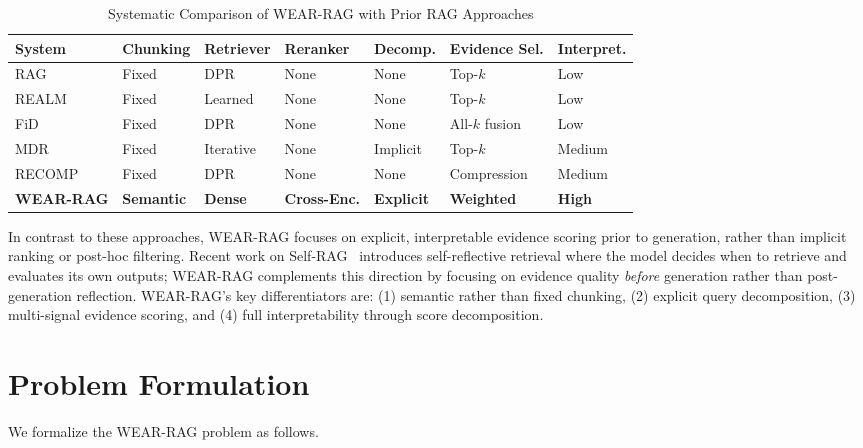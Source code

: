\documentclass[conference]{IEEEtran}
\begin{document}
\begin{table}[t]
\centering
\caption{Systematic Comparison of WEAR-RAG with Prior RAG Approaches}
\label{tab:lit-compare}
\footnotesize
\begin{tabular}{p{2.2cm} p{1.8cm} p{1.5cm} p{1.5cm} p{1.5cm} p{1.8cm} p{2.0cm}}
\toprule
\textbf{System} & \textbf{Chunking} & \textbf{Retriever} & \textbf{Reranker} & \textbf{Decomp.} & \textbf{Evidence Sel.} & \textbf{Interpret.} \\
\midrule
RAG~\cite{lewis2020rag} & Fixed & DPR & None & None & Top-$k$ & Low \\
REALM~\cite{guu2020realm} & Fixed & Learned & None & None & Top-$k$ & Low \\
FiD~\cite{izacard2021leveraging} & Fixed & DPR & None & None & All-$k$ fusion & Low \\
MDR~\cite{xiong2021mdr} & Fixed & Iterative & None & Implicit & Top-$k$ & Medium \\
RECOMP~\cite{xu2024recomp} & Fixed & DPR & None & None & Compression & Medium \\
\textbf{WEAR-RAG} & \textbf{Semantic} & \textbf{Dense} & \textbf{Cross-Enc.} & \textbf{Explicit} & \textbf{Weighted} & \textbf{High} \\
\bottomrule
\end{tabular}
\end{table}

In contrast to these approaches, WEAR-RAG focuses on explicit, interpretable evidence scoring prior to generation, rather than implicit ranking or post-hoc filtering. Recent work on Self-RAG~\cite{asai2024selfrag} introduces self-reflective retrieval where the model decides when to retrieve and evaluates its own outputs; WEAR-RAG complements this direction by focusing on evidence quality \textit{before} generation rather than post-generation reflection. WEAR-RAG's key differentiators are: (1) semantic rather than fixed chunking, (2) explicit query decomposition, (3) multi-signal evidence scoring, and (4) full interpretability through score decomposition.

\section{Problem Formulation}

We formalize the WEAR-RAG problem as follows.
\end{document}
